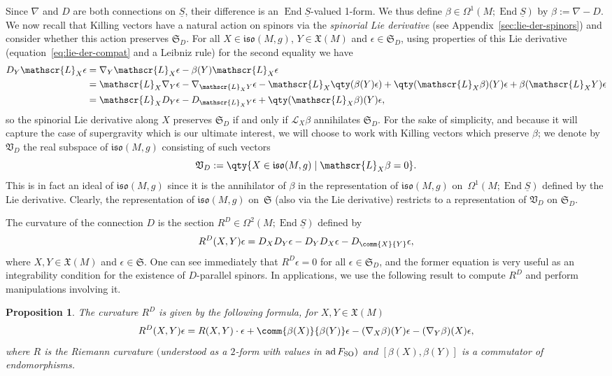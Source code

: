 \documentclass[pdftex]{sigma}
\numberwithin{equation}{section}
\newtheorem{Proposition}[Theorem]{Proposition}
 { \theoremstyle{definition}
\newtheorem{Definition}[Theorem]{Definition}
\newtheorem{Note}[Theorem]{Note}
\newtheorem{Example}[Theorem]{Example}
\newtheorem{Remark}[Theorem]{Remark} }
\newcommand{\fiso}{\mathfrak{iso}}
\newcommand{\fX}{\mathfrak{X}}
\newcommand{\fS}{\mathfrak{S}}
\newcommand{\fV}{\mathfrak{V}}
\newcommand{\eL}{\mathscr{L}}
\newcommand{\Sbundle}{\underline{S}}
\newcommand{\1}{\mathbbm{1}}
\DeclareMathOperator{\End}{End}
\DeclareMathOperator{\ad}{ad}
\begin{document}
Since $\nabla$ and $D$ are both connections on $\Sbundle$, their difference is an $\End\Sbundle$-valued 1-form. We thus define $\beta\in\Omega^1(M;\End\Sbundle)$ by $\beta := \nabla - D$. We now recall that Killing vectors have a natural action on spinors via the \emph{spinorial Lie derivative} (see Appendix~\ref{sec:lie-der-spinors}) and consider whether this action preserves $\fS_D$. For all $X\in\fiso(M,g)$, $Y\in\fX(M)$ and $\epsilon\in\fS_D$, using properties of this Lie derivative (equation~\eqref{eq:lie-der-compat} and a Leibniz rule) for the second equality we have
\begin{align*}
	D_Y\eL_X \epsilon
	&= \nabla_Y\eL_X\epsilon -\beta(Y)\eL_X\epsilon\\
&= \eL_X\nabla_Y\epsilon -\nabla_{\eL_X Y}\epsilon -\eL_X\qty(\beta(Y)\epsilon) +\qty(\eL_X\beta)(Y)\epsilon +\beta(\eL_XY)\epsilon\\
	&= \eL_X D_Y\epsilon - D_{\eL_X Y}\epsilon +\qty(\eL_X\beta)(Y)\epsilon,
\end{align*}
so the spinorial Lie derivative along $X$ preserves $\fS_D$ if and only if $\eL_X\beta$ annihilates $\fS_D$. For the sake of simplicity, and because it will capture the case of supergravity which is our ultimate interest, we will choose to work with Killing vectors which preserve $\beta$; we denote by $\fV_D$ the real subspace of $\fiso(M,g)$ consisting of such vectors
\[
\fV_D := \qty{X\in\fiso(M,g)\mid \eL_X \beta = 0}.
\]
This is in fact an ideal of $\fiso(M,g)$ since it is the annihilator of $\beta$ in the representation of $\fiso(M,g)$ on~$\Omega^1(M;\End\Sbundle)$ defined by the Lie derivative. Clearly, the representation of $\fiso(M,g)$ on~$\fS$ (also via the Lie derivative) restricts to a representation of $\fV_D$ on $\fS_D$.

The curvature of the connection $D$ is the section $R^D \in \Omega^2(M;\End\Sbundle)$ defined by
\begin{gather}\label{eq:D-curvature-def}
	R^D(X,Y)\epsilon = D_XD_Y\epsilon - D_YD_X\epsilon - D_{\comm{X}{Y}}\epsilon,
\end{gather}
where $X,Y\in\fX(M)$ and $\epsilon\in\fS$. One can see immediately that $R^D\epsilon=0$ for all $\epsilon\in\fS_D$, and the former equation is very useful as an integrability condition for the existence of $D$-parallel spinors. In applications, we use the following result to compute $R^D$ and perform manipulations involving it.

\begin{Proposition}\label{prop:D-curvature}
	The curvature $R^D$ is given by the following formula, for $X,Y\in\fX(M)$
	\begin{equation}\label{eq:D-curvature-formula}
		R^D(X,Y)\epsilon = R(X,Y)\cdot\epsilon + \comm{\beta(X)}{\beta(Y)}\epsilon - (\nabla_X\beta)(Y)\epsilon - (\nabla_Y\beta)(X)\epsilon,
	\end{equation}
	where $R$ is the Riemann curvature $($understood as a $2$-form with values in $\ad F_{\rm SO})$ and $[\beta(X),\allowbreak\beta(Y)]$ is a commutator of endomorphisms.
\end{Proposition}
\end{document}
